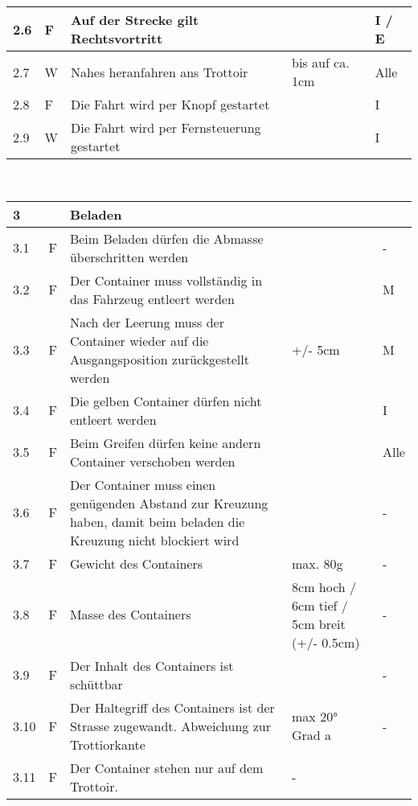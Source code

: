 \begin{center}
\begin{tabular}{|p{1cm}|p{0.5cm}|p{5cm}|p{5cm}|p{1.5cm}|}
 2.6 & F & Auf der Strecke gilt Rechtsvortritt & & I / E \\\hline
 2.7 & W & Nahes heranfahren ans Trottoir & bis auf ca. 1cm & Alle\\\hline
 2.8 & F & Die Fahrt wird per Knopf gestartet & & I\\\hline
 2.9 & W & Die Fahrt wird per Fernsteuerung gestartet & & I \\\hline
\end{tabular}\\[0.3cm]
\begin{tabular}{|p{1cm}|p{0.5cm}|p{5cm}|p{5cm}|p{1.5cm}|}\hline
 \textbf{3} & & \textbf{Beladen} & & \\\hline
 3.1 & F & Beim Beladen dürfen die Abmasse überschritten werden & & -\\\hline
 3.2 & F & Der Container muss vollständig in das Fahrzeug entleert werden & & M\\\hline
 3.3 & F & Nach der Leerung muss der Container wieder auf die Ausgangsposition zurückgestellt werden & +/- 5cm & M\\\hline
 3.4 & F & Die gelben Container dürfen nicht entleert werden & & I\\\hline
 3.5 & F & Beim Greifen dürfen keine andern Container verschoben werden & & Alle\\\hline
 3.6 & F & Der Container muss einen genügenden Abstand zur Kreuzung haben, damit beim beladen die Kreuzung nicht blockiert wird & & - \\\hline 
 3.7 & F & Gewicht des Containers & max. 80g & - \\\hline 
 3.8 & F & Masse des Containers& 8cm hoch  / 6cm tief / 5cm breit (+/- 0.5cm) & - \\\hline 
 3.9 & F & Der Inhalt des Containers ist schüttbar &  & - \\\hline 
 3.10 & F & Der Haltegriff des Containers ist der Strasse zugewandt. Abweichung zur Trottiorkante & max 20° Grad a  & - \\\hline 
 3.11 & F & Der Container stehen nur auf dem Trottoir.  & - \\\hline 
\end{tabular}
\end{center}
